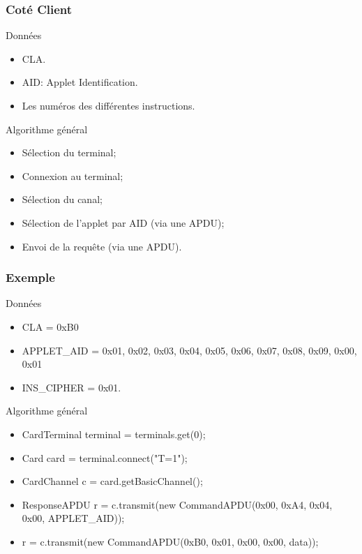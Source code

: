 \documentclass{beamer}
\begin{document}
\begin{frame}
	\frametitle{Coté Client}
	\begin{block}{Données}
		\begin{itemize}
			\item CLA.
			\item AID: Applet Identification.
			\item Les numéros des différentes instructions.
		\end{itemize}
	\end{block}
	\begin{block}{Algorithme général}
		\begin{itemize}
			\item Sélection du terminal;
			\item Connexion au terminal;
			\item Sélection du canal;
			\item Sélection de l'applet par AID (via une APDU);
			\item Envoi de la requête (via une APDU).
		\end{itemize}
	\end{block}
\end{frame}

\begin{frame}
	\frametitle{Exemple}
	\begin{exampleblock}{Données}
		\begin{itemize}
			\item CLA = 0xB0
			\item APPLET\_AID = {0x01, 0x02, 0x03, 0x04, 0x05, 0x06, 0x07, 0x08, 0x09, 0x00, 0x01}
			\item INS\_CIPHER = 0x01.
		\end{itemize}
	\end{exampleblock}
	\begin{exampleblock}{Algorithme général}
		\begin{itemize}
			\item CardTerminal terminal = terminals.get(0);
			\item Card card = terminal.connect("T=1");
			\item CardChannel c = card.getBasicChannel();
			\item ResponseAPDU r = c.transmit(new CommandAPDU(0x00, 0xA4, 0x04, 0x00, APPLET\_AID));
			\item r = c.transmit(new CommandAPDU(0xB0, 0x01, 0x00, 0x00, data));
		\end{itemize}
	\end{exampleblock}
\end{frame}
\end{document}
